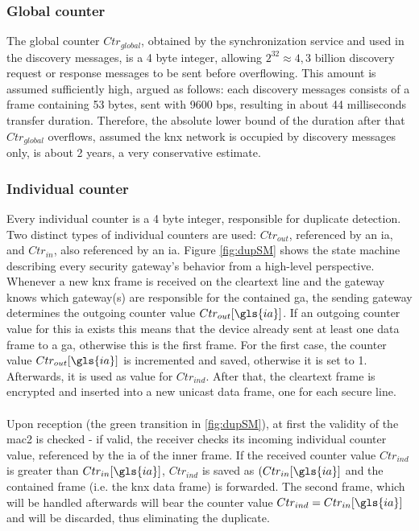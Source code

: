 \subsubsection{Global counter}\label{ctrInd}
The global counter $Ctr_{global}$, obtained by the synchronization service and used in the discovery messages,
is a 4 byte integer, allowing $2^{32} \approx 4,3$ billion discovery request or response messages to be sent before overflowing.
This amount is assumed sufficiently high, argued as follows:
each discovery messages consists of a frame containing 53 bytes, sent with 9600 \gls{bps}, resulting in about 44 milliseconds transfer duration. Therefore,
the absolute lower bound of the duration after that $Ctr_{global}$ overflows, assumed the \gls{knx} network is occupied by discovery messages only,
is about 2 years, a very conservative estimate.

\subsubsection{Individual counter}\label{ctrInd}

Every individual counter is a 4 byte integer, responsible for duplicate detection. Two distinct types of individual counters are used: $Ctr_{out}$, referenced
by an \gls{ia}, and $Ctr_{in}$, also referenced by an \gls{ia}.
Figure \ref{fig:dupSM} shows the state machine describing every security gateway's behavior from a high-level perspective.
\\
Whenever a new \gls{knx} frame is received on the cleartext line and the gateway knows which gateway(s) are responsible for the
contained \gls{ga}, the sending gateway determines the outgoing counter value $Ctr_{out}[\gls{ia}]$. If an outgoing counter value for
this \gls{ia} exists 
this means that the device already sent at least one data frame to a \gls{ga}, otherwise this is the first frame. For the first case,
the counter value $Ctr_{out}[\gls{ia}]$ is incremented and saved, otherwise it is set to 1. Afterwards, it is used as value for $Ctr_{ind}$.
After that, the cleartext frame is encrypted and inserted into a new unicast data frame, one for each secure line.
\\
\\
Upon reception (the green transition in \ref{fig:dupSM}), at first the validity of the \gls{mac2} is checked - if valid, the receiver checks its incoming
individual counter value, referenced by the \gls{ia} of the inner frame. If the received counter value $Ctr_{ind}$ is greater than $Ctr_{in}[\gls{ia}]$,
 $Ctr_{ind}$ is saved as $(Ctr_{in}[\gls{ia}]$ and the contained frame (i.e. the \gls{knx} data frame) is forwarded. The second frame, which will be handled 
afterwards will bear the counter value $Ctr_{ind} = Ctr_{in}[\gls{ia}]$ and will be discarded, thus eliminating the duplicate.


